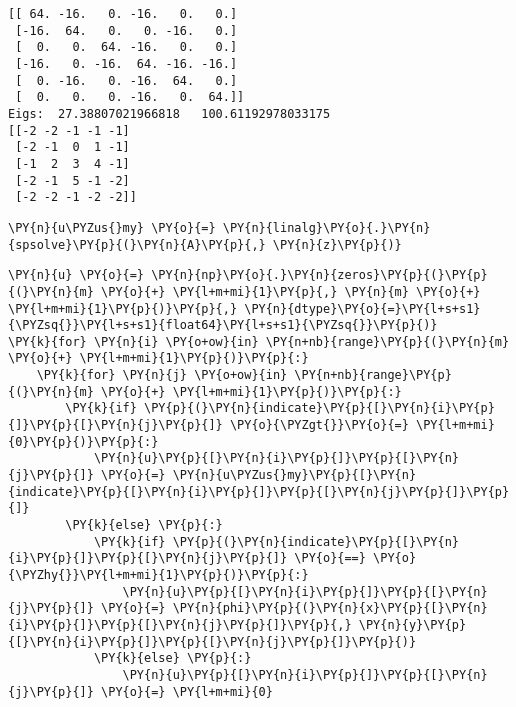     \begin{Verbatim}[commandchars=\\\{\}]
[[ 64. -16.   0. -16.   0.   0.]
 [-16.  64.   0.   0. -16.   0.]
 [  0.   0.  64. -16.   0.   0.]
 [-16.   0. -16.  64. -16. -16.]
 [  0. -16.   0. -16.  64.   0.]
 [  0.   0.   0. -16.   0.  64.]]
Eigs:  27.38807021966818   100.61192978033175
[[-2 -2 -1 -1 -1]
 [-2 -1  0  1 -1]
 [-1  2  3  4 -1]
 [-2 -1  5 -1 -2]
 [-2 -2 -1 -2 -2]]
    \end{Verbatim}

    \begin{tcolorbox}[breakable, size=fbox, boxrule=1pt, pad at break*=1mm,colback=cellbackground, colframe=cellborder]
\begin{Verbatim}[commandchars=\\\{\}]
\PY{n}{u\PYZus{}my} \PY{o}{=} \PY{n}{linalg}\PY{o}{.}\PY{n}{spsolve}\PY{p}{(}\PY{n}{A}\PY{p}{,} \PY{n}{z}\PY{p}{)}
\end{Verbatim}
\end{tcolorbox}

    \begin{tcolorbox}[breakable, size=fbox, boxrule=1pt, pad at break*=1mm,colback=cellbackground, colframe=cellborder]
\begin{Verbatim}[commandchars=\\\{\}]
\PY{n}{u} \PY{o}{=} \PY{n}{np}\PY{o}{.}\PY{n}{zeros}\PY{p}{(}\PY{p}{(}\PY{n}{m} \PY{o}{+} \PY{l+m+mi}{1}\PY{p}{,} \PY{n}{m} \PY{o}{+} \PY{l+m+mi}{1}\PY{p}{)}\PY{p}{,} \PY{n}{dtype}\PY{o}{=}\PY{l+s+s1}{\PYZsq{}}\PY{l+s+s1}{float64}\PY{l+s+s1}{\PYZsq{}}\PY{p}{)}
\PY{k}{for} \PY{n}{i} \PY{o+ow}{in} \PY{n+nb}{range}\PY{p}{(}\PY{n}{m} \PY{o}{+} \PY{l+m+mi}{1}\PY{p}{)}\PY{p}{:}
    \PY{k}{for} \PY{n}{j} \PY{o+ow}{in} \PY{n+nb}{range}\PY{p}{(}\PY{n}{m} \PY{o}{+} \PY{l+m+mi}{1}\PY{p}{)}\PY{p}{:}
        \PY{k}{if} \PY{p}{(}\PY{n}{indicate}\PY{p}{[}\PY{n}{i}\PY{p}{]}\PY{p}{[}\PY{n}{j}\PY{p}{]} \PY{o}{\PYZgt{}}\PY{o}{=} \PY{l+m+mi}{0}\PY{p}{)}\PY{p}{:}
            \PY{n}{u}\PY{p}{[}\PY{n}{i}\PY{p}{]}\PY{p}{[}\PY{n}{j}\PY{p}{]} \PY{o}{=} \PY{n}{u\PYZus{}my}\PY{p}{[}\PY{n}{indicate}\PY{p}{[}\PY{n}{i}\PY{p}{]}\PY{p}{[}\PY{n}{j}\PY{p}{]}\PY{p}{]}
        \PY{k}{else} \PY{p}{:}
            \PY{k}{if} \PY{p}{(}\PY{n}{indicate}\PY{p}{[}\PY{n}{i}\PY{p}{]}\PY{p}{[}\PY{n}{j}\PY{p}{]} \PY{o}{==} \PY{o}{\PYZhy{}}\PY{l+m+mi}{1}\PY{p}{)}\PY{p}{:}
                \PY{n}{u}\PY{p}{[}\PY{n}{i}\PY{p}{]}\PY{p}{[}\PY{n}{j}\PY{p}{]} \PY{o}{=} \PY{n}{phi}\PY{p}{(}\PY{n}{x}\PY{p}{[}\PY{n}{i}\PY{p}{]}\PY{p}{[}\PY{n}{j}\PY{p}{]}\PY{p}{,} \PY{n}{y}\PY{p}{[}\PY{n}{i}\PY{p}{]}\PY{p}{[}\PY{n}{j}\PY{p}{]}\PY{p}{)}
            \PY{k}{else} \PY{p}{:}
                \PY{n}{u}\PY{p}{[}\PY{n}{i}\PY{p}{]}\PY{p}{[}\PY{n}{j}\PY{p}{]} \PY{o}{=} \PY{l+m+mi}{0}
\end{Verbatim}
\end{tcolorbox}

